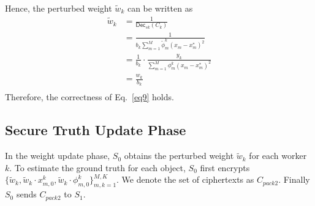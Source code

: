 \documentclass[conference]{IEEEtran}
\begin{document}
Hence, the perturbed weight $\tilde{w}_k$ can be written as
\begin{equation}
  \begin{split}
  \tilde{w}_k & = \frac{1}{\mathsf{Dec}_{sk}\left(C_k\right)} \\
  & = \frac{1}{b_k \sum_{m=1}^M \tilde{\phi}_m^k (x_m - x_m^*)^2} \\
  & = \frac{1}{b_k} \cdot \frac{y_k}{\sum_{m=1}^M \phi_m^k (x_m - x_m^*)^2} \\
  & = \frac{w_k}{b_k} \\
  \end{split}
\end{equation}
Therefore, the correctness of Eq.~\ref{eq9} holds.


\subsection{Secure Truth Update Phase}

In the weight update phase, $S_0$ obtains the perturbed weight $\tilde{w}_k$ for each worker $k$.
To estimate the ground truth for each object, $S_0$ first encrypts $\{\tilde{w}_k, \tilde{w}_k\cdot x_{m,0}^k, \tilde{w}_k\cdot \phi_{m,0}^k\}_{m,k=1}^{M,K}$.
We denote the set of ciphertexts as $C_{pack2}$.
Finally $S_0$ sends $C_{pack2}$ to $S_1$.
\end{document}
